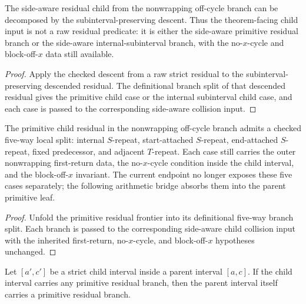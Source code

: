 \begin{theorem}
  \label{thm:smaller-residual-descended-branch-cases}
  \leanok
  The side-aware residual child from the nonwrapping off-cycle branch can be
  decomposed by the subinterval-preserving descent.  Thus the theorem-facing
  child input is not a raw residual predicate: it is either the side-aware
  primitive residual branch or the side-aware internal-subinterval branch,
  with the no-\(x\)-cycle and block-off-\(x\) data still available.
\end{theorem}

\begin{proof}
  \leanok
  Apply the checked descent from a raw strict residual to the
  subinterval-preserving descended residual.  The definitional branch split of
  that descended residual gives the primitive child case or the internal
  subinterval child case, and each case is passed to the corresponding
  side-aware collision input.
\end{proof}

\begin{theorem}
  \label{thm:smaller-primitive-child-branch-cases}
  \leanok
  The primitive child residual in the nonwrapping off-cycle branch admits a
  checked five-way local split:
  internal \(S\)-repeat, start-attached \(S\)-repeat, end-attached
  \(S\)-repeat, fixed predecessor, and adjacent \(T\)-repeat.  Each case still
  carries the outer nonwrapping first-return data, the no-\(x\)-cycle condition
  inside the child interval, and the block-off-\(x\) invariant.  The current
  endpoint no longer exposes these five cases separately; the following
  arithmetic bridge absorbs them into the parent primitive leaf.
\end{theorem}

\begin{proof}
  \leanok
  Unfold the primitive residual frontier into its definitional five-way branch
  split.  Each branch is passed to the corresponding side-aware child
  collision input with the inherited first-return, no-\(x\)-cycle, and
  block-off-\(x\) hypotheses unchanged.
\end{proof}

\begin{theorem}
  \label{thm:smaller-child-primitive-absorbed}
  \leanok
  Let \([a',c']\) be a strict child interval inside a parent interval
  \([a,c]\).  If the child interval carries any primitive residual branch, then
  the parent interval itself carries a primitive residual branch.
\end{theorem}

